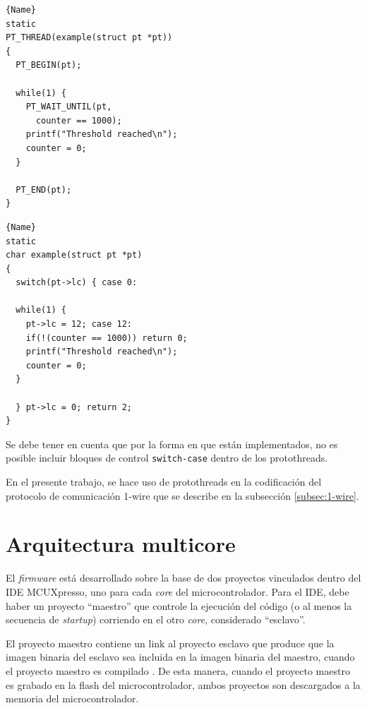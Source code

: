\noindent\begin{minipage}{.5\textwidth}
\begin{lstlisting}[caption=Ejemplo de uso,frame=tlrb,basicstyle=\footnotesize,label={lst:proto1}]{Name}
static
PT_THREAD(example(struct pt *pt))
{
  PT_BEGIN(pt);
  
  while(1) {
    PT_WAIT_UNTIL(pt,
      counter == 1000);
    printf("Threshold reached\n");
    counter = 0;
  }
  
  PT_END(pt);
}
\end{lstlisting}
\end{minipage}\hfill
\begin{minipage}{.5\textwidth}
\begin{lstlisting}[caption=Código expandido,frame=tlrb,basicstyle=\footnotesize,label={lst:proto2}]{Name}
static
char example(struct pt *pt)
{
  switch(pt->lc) { case 0:
 
  while(1) {
    pt->lc = 12; case 12:
    if(!(counter == 1000)) return 0;
    printf("Threshold reached\n");
    counter = 0;
  }
 
  } pt->lc = 0; return 2;
}
\end{lstlisting}
\end{minipage}

Se debe tener en cuenta que por la forma en que están implementados, no es posible incluir bloques de control \texttt{switch-case} dentro de los protothreads.	

En el presente trabajo, se hace uso de protothreads en la codificación del protocolo de comunicación 1-wire que se describe en la subsección \ref{subsec:1-wire}.


\section{Arquitectura multicore}
\label{sec:arquitectura}

El \textit{firmware} está desarrollado sobre la base de dos proyectos vinculados dentro del IDE MCUXpresso, uno para cada \textit{core} del microcontrolador. Para el IDE, debe haber un proyecto ``maestro'' que controle la ejecución del código (o al menos la secuencia de \textit{startup}) corriendo en el otro \textit{core}, considerado ``esclavo''.  

El proyecto maestro contiene un link al proyecto esclavo que produce que la imagen binaria del esclavo sea incluida en la imagen  binaria del maestro, cuando el proyecto maestro es compilado \citep{nxp:mcuxpresso}. De esta manera, cuando el proyecto maestro es grabado en la flash del microcontrolador, ambos proyectos son descargados a la memoria del microcontrolador.

